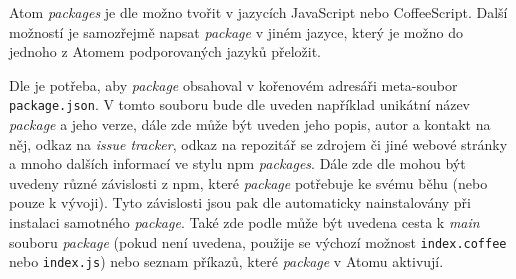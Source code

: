 Atom \textit{packages} je dle \cite{atom-docs} možno tvořit v jazycích JavaScript nebo CoffeeScript. Další možností je
samozřejmě napsat \textit{package} v jiném jazyce, který je možno do jednoho z Atomem podporovaných jazyků přeložit.

Dle \cite{atom-docs} je potřeba, aby \textit{package} obsahoval v kořenovém adresáři meta-soubor \texttt
{package.json}. V tomto souboru bude dle \cite{atom-docs} uveden například unikátní název \textit{package} a jeho verze,
dále zde může být uveden jeho popis, autor a kontakt na něj, odkaz na \textit{issue tracker}, odkaz na repozitář se
zdrojem či jiné webové stránky a mnoho dalších informací ve stylu npm \textit{packages}. Dále zde dle \cite{atom-docs}
mohou být uvedeny různé závislosti z npm, které \textit{package} potřebuje ke svému běhu (nebo pouze k vývoji). Tyto
závislosti jsou pak dle \cite{atom-docs} automaticky nainstalovány při instalaci samotného \textit{package}. Také zde
podle \cite{atom-docs} může být uvedena cesta k \textit{main} souboru \textit{package} (pokud není uvedena, použije se
výchozí možnost \texttt{index.coffee} nebo \texttt{index.js}) nebo seznam příkazů, které \textit
{package} v Atomu aktivují.

